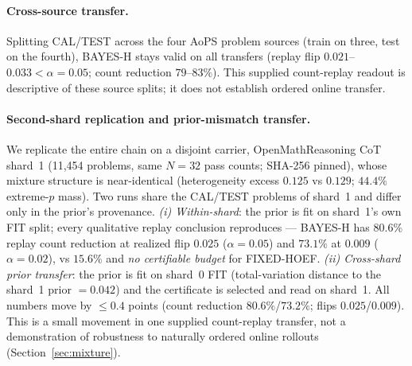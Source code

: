 \documentclass{article}
\theoremstyle{definition}
\theoremstyle{remark}
\begin{document}
\paragraph{Cross-source transfer.} Splitting CAL/TEST across the four AoPS
problem sources (train on three, test on the fourth), BAYES-H stays valid on
all transfers (replay flip $0.021$--$0.033<\alpha=0.05$; count reduction $79$--$83\%$).
This supplied count-replay readout is descriptive of these source splits; it
does not establish ordered online transfer.

\paragraph{Second-shard replication and prior-mismatch transfer.}
We replicate the entire chain on a disjoint carrier, OpenMathReasoning CoT
shard~1 (11{,}454 problems, same $N{=}32$ pass counts; SHA-256 pinned), whose
mixture structure is near-identical (heterogeneity excess $0.125$ vs $0.129$;
$44.4\%$ extreme-$p$ mass). Two runs share the CAL/TEST problems of shard~1 and
differ only in the prior's provenance. \emph{(i) Within-shard}: the prior is
fit on shard~1's own FIT split; every qualitative replay conclusion reproduces ---
BAYES-H has $80.6\%$ replay count reduction at realized flip $0.025$ ($\alpha=0.05$) and $73.1\%$ at
$0.009$ ($\alpha=0.02$), vs $15.6\%$ and \emph{no certifiable budget} for
FIXED-HOEF. \emph{(ii) Cross-shard prior transfer}: the prior is fit on
shard~0 FIT (total-variation distance to the shard~1 prior $=0.042$) and the
certificate is selected and read on shard~1. All numbers move by $\le0.4$
points (count reduction $80.6\%$/$73.2\%$; flips $0.025$/$0.009$). This is a
small movement in one supplied count-replay transfer, not a demonstration of
robustness to naturally ordered online rollouts (Section~\ref{sec:mixture}).
\end{document}

